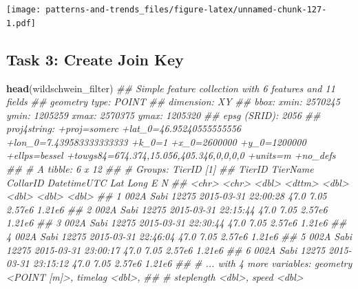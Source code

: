 \documentclass[]{book}
\newenvironment{Shaded}{\begin{snugshade}}{\end{snugshade}}
\newcommand{\CommentTok}[1]{\textcolor[rgb]{0.56,0.35,0.01}{\textit{#1}}}
\newcommand{\KeywordTok}[1]{\textcolor[rgb]{0.13,0.29,0.53}{\textbf{#1}}}
\newcommand{\NormalTok}[1]{#1}
\newcommand{\OperatorTok}[1]{\textcolor[rgb]{0.81,0.36,0.00}{\textbf{#1}}}
\newcommand{\StringTok}[1]{\textcolor[rgb]{0.31,0.60,0.02}{#1}}
\begin{document}
\texttt{[image: patterns-and-trends\_files/figure-latex/unnamed-chunk-127-1.pdf]}

\begin{Shaded}
\end{Shaded}

\hypertarget{task-3-create-join-key}{%
\subsection{Task 3: Create Join Key}\label{task-3-create-join-key}}

\begin{Shaded}
\begin{Highlighting}[]
\KeywordTok{head}\NormalTok{(wildschwein_filter)}
\CommentTok{## Simple feature collection with 6 features and 11 fields}
\CommentTok{## geometry type:  POINT}
\CommentTok{## dimension:      XY}
\CommentTok{## bbox:           xmin: 2570245 ymin: 1205259 xmax: 2570375 ymax: 1205320}
\CommentTok{## epsg (SRID):    2056}
\CommentTok{## proj4string:    +proj=somerc +lat_0=46.95240555555556 +lon_0=7.439583333333333 +k_0=1 +x_0=2600000 +y_0=1200000 +ellps=bessel +towgs84=674.374,15.056,405.346,0,0,0,0 +units=m +no_defs}
\CommentTok{## # A tibble: 6 x 12}
\CommentTok{## # Groups:   TierID [1]}
\CommentTok{##   TierID TierName CollarID DatetimeUTC           Lat  Long      E      N}
\CommentTok{##   <chr>  <chr>       <dbl> <dttm>              <dbl> <dbl>  <dbl>  <dbl>}
\CommentTok{## 1 002A   Sabi        12275 2015-03-31 22:00:28  47.0  7.05 2.57e6 1.21e6}
\CommentTok{## 2 002A   Sabi        12275 2015-03-31 22:15:44  47.0  7.05 2.57e6 1.21e6}
\CommentTok{## 3 002A   Sabi        12275 2015-03-31 22:30:44  47.0  7.05 2.57e6 1.21e6}
\CommentTok{## 4 002A   Sabi        12275 2015-03-31 22:46:04  47.0  7.05 2.57e6 1.21e6}
\CommentTok{## 5 002A   Sabi        12275 2015-03-31 23:00:17  47.0  7.05 2.57e6 1.21e6}
\CommentTok{## 6 002A   Sabi        12275 2015-03-31 23:15:12  47.0  7.05 2.57e6 1.21e6}
\CommentTok{## # ... with 4 more variables: geometry <POINT [m]>, timelag <dbl>,}
\CommentTok{## #   steplength <dbl>, speed <dbl>}
\end{Highlighting}
\end{Shaded}
\end{document}
